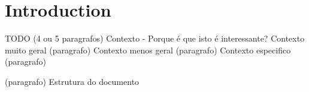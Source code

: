 \section{Introduction}
TODO
(4 ou 5 paragrafos)
Contexto - Porque é que isto é interessante?
Contexto muito geral (paragrafo)
Contexto menos geral (paragrafo)
Contexto especifico (paragrafo)

(paragrafo)
Estrutura do documento